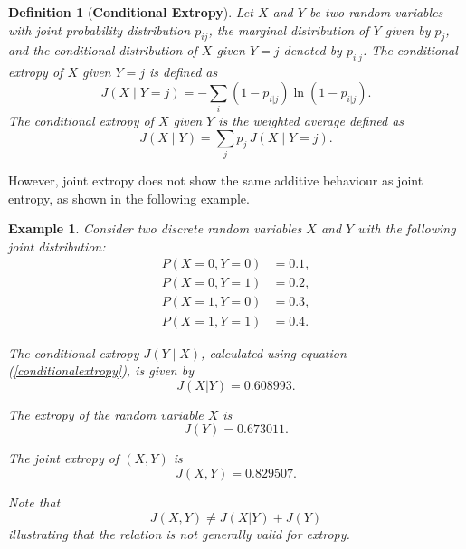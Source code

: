 \documentclass[pdflatex]{sn-jnl}%
\theoremstyle{thmstyleone}
\newtheorem{example}{Example}
\theoremstyle{thmstyletwo}%
\theoremstyle{thmstylethree}%
\newtheorem{definition}{Definition}%
\begin{document}
\begin{definition}[\textbf{Conditional Extropy}]
    Let $X$ and $Y$ be two random variables with joint probability distribution $p_{ij}$, the marginal distribution of $Y$ given by $p_j$, and the conditional distribution of $X$ given $Y = j$ denoted by $p_{i|j}$. The conditional extropy of $X$ given $Y = j$ is defined as
    \begin{equation}
     J(X \mid Y = j) = -\sum_{i}\left(1-p_{i|j} \right)\ln\left(1-p_{i|j}\right).
     \end{equation}
     The conditional extropy of $X$ given $Y$ is the weighted average defined as
     \begin{equation}\label{conditionalextropy}
     J(X \mid Y) = \sum_j p_j \, J(X \mid Y = j).
     \end{equation}
\end{definition}
However, joint extropy does not show the same additive behaviour as joint entropy, as shown in the following example.
\begin{example} Consider two discrete random variables \( X \) and \( Y \) with the following joint distribution:
\[
\begin{aligned}
P(X = 0, Y = 0) &= 0.1, \\
P(X = 0, Y = 1) &= 0.2, \\
P(X = 1, Y = 0) &= 0.3, \\
P(X = 1, Y = 1) &= 0.4.
\end{aligned}
\]

\noindent The conditional extropy \( J(Y \mid X) \), calculated using equation (\ref{conditionalextropy}), is given by
\[
J(X|Y) = 0.608993.
\]

\noindent The extropy of the random variable \( X \) is
\[
J(Y) = 0.673011.
\]

\noindent The joint extropy of $(X,Y)$ is
\[
J(X, Y) = 0.829507.
\]

\noindent Note that
\[
J(X, Y) \neq J(X|Y) + J(Y)
\]
illustrating that the relation is not generally valid for extropy.
\end{example}
\end{document}
